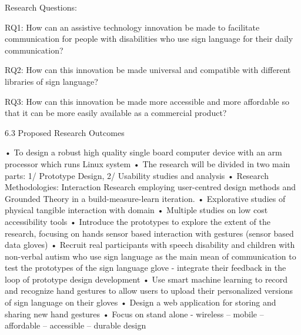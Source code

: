 Research Questions: 

RQ1: How can an assistive technology innovation be made to facilitate communication for people with disabilities who use sign language for their daily communication?

RQ2: How can  this innovation be made universal and compatible with different libraries of sign language?

RQ3: How can this innovation be made more accessible and more affordable so that it can be more easily available as a commercial product?

6.3 Proposed Research Outcomes 

•	To design a robust high quality single board computer device with an arm processor which runs Linux system 
•	The research will be divided in two main parts: 1/ Prototype Design, 2/ Usability studies and analysis
•	Research Methodologies: Interaction Research employing user-centred design methods and Grounded Theory in a build-measure-learn iteration.
•	Explorative studies of physical tangible interaction with domain
•	Multiple studies on low cost accessibility tools
•	Introduce the prototypes to explore the extent of the research, focusing on hands sensor based interaction with gestures (sensor based data gloves)
•	Recruit real participants with speech disability and children with non-verbal autism who use sign language as the main mean of communication to test the prototypes of the sign language glove - integrate their feedback in the loop of prototype design development 
•	Use smart machine learning to record and recognize hand gestures to allow users to upload their personalized versions of sign language on their gloves 
•	Design a web application for storing and sharing new hand gestures 
•	Focus on stand alone - wireless – mobile – affordable – accessible – durable design 
